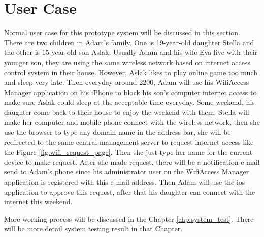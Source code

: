 \section{User Case}
\par Normal user case for this prototype system will be discussed in this section. There are two children in Adam's family. One is 19-year-old daughter Stella and the other is 15-year-old son Aslak. Usually Adam and his wife Eva live with their younger son, they are using the same wireless network based on internet access control system in their house. However, Aslak likes to play online game too much and sleep very late. Then everyday around 2200, Adam will use his WifiAccess Manager application on his iPhone to block his son's computer internet access to make sure Aslak could sleep at the acceptable time everyday. Some weekend, his daughter come back to their house to enjoy the weekend with them. Stella will make her computer and mobile phone connect with the wireless network, then she use the browser to type any domain name in the address bar, she will be redirected to the same central management server to request internet access like the Figure \ref{fig:wifi_request_page}. Then she just type her name for the current device to make request. After she made request, there will be a notification e-mail send to Adam's phone since his administrator user on the WifiAccess Manager application is registered with this e-mail address. Then Adam will use the ios application to approve this request, after that his daughter can connect with the internet this weekend.

\par More working process will be discussed in the Chapter \ref{chp:system_test}. There will be more detail system testing result in that Chapter.